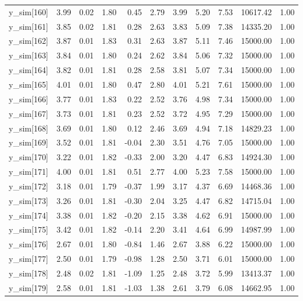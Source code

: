 \begin{table}[ht]
\begin{tabular}{rrrrrrrrrrr}
  y\_sim[160] & 3.99 & 0.02 & 1.80 & 0.45 & 2.79 & 3.99 & 5.20 & 7.53 & 10617.42 & 1.00 \\ 
  y\_sim[161] & 3.85 & 0.02 & 1.81 & 0.28 & 2.63 & 3.83 & 5.09 & 7.38 & 14335.20 & 1.00 \\ 
  y\_sim[162] & 3.87 & 0.01 & 1.83 & 0.31 & 2.63 & 3.87 & 5.11 & 7.46 & 15000.00 & 1.00 \\ 
  y\_sim[163] & 3.84 & 0.01 & 1.80 & 0.24 & 2.62 & 3.84 & 5.06 & 7.32 & 15000.00 & 1.00 \\ 
  y\_sim[164] & 3.82 & 0.01 & 1.81 & 0.28 & 2.58 & 3.81 & 5.07 & 7.34 & 15000.00 & 1.00 \\ 
  y\_sim[165] & 4.01 & 0.01 & 1.80 & 0.47 & 2.80 & 4.01 & 5.21 & 7.61 & 15000.00 & 1.00 \\ 
  y\_sim[166] & 3.77 & 0.01 & 1.83 & 0.22 & 2.52 & 3.76 & 4.98 & 7.34 & 15000.00 & 1.00 \\ 
  y\_sim[167] & 3.73 & 0.01 & 1.81 & 0.23 & 2.52 & 3.72 & 4.95 & 7.29 & 15000.00 & 1.00 \\ 
  y\_sim[168] & 3.69 & 0.01 & 1.80 & 0.12 & 2.46 & 3.69 & 4.94 & 7.18 & 14829.23 & 1.00 \\ 
  y\_sim[169] & 3.52 & 0.01 & 1.81 & -0.04 & 2.30 & 3.51 & 4.76 & 7.05 & 15000.00 & 1.00 \\ 
  y\_sim[170] & 3.22 & 0.01 & 1.82 & -0.33 & 2.00 & 3.20 & 4.47 & 6.83 & 14924.30 & 1.00 \\ 
  y\_sim[171] & 4.00 & 0.01 & 1.81 & 0.51 & 2.77 & 4.00 & 5.23 & 7.58 & 15000.00 & 1.00 \\ 
  y\_sim[172] & 3.18 & 0.01 & 1.79 & -0.37 & 1.99 & 3.17 & 4.37 & 6.69 & 14468.36 & 1.00 \\ 
  y\_sim[173] & 3.26 & 0.01 & 1.81 & -0.30 & 2.04 & 3.25 & 4.47 & 6.82 & 14715.04 & 1.00 \\ 
  y\_sim[174] & 3.38 & 0.01 & 1.82 & -0.20 & 2.15 & 3.38 & 4.62 & 6.91 & 15000.00 & 1.00 \\ 
  y\_sim[175] & 3.42 & 0.01 & 1.82 & -0.14 & 2.20 & 3.41 & 4.64 & 6.99 & 14987.99 & 1.00 \\ 
  y\_sim[176] & 2.67 & 0.01 & 1.80 & -0.84 & 1.46 & 2.67 & 3.88 & 6.22 & 15000.00 & 1.00 \\ 
  y\_sim[177] & 2.50 & 0.01 & 1.79 & -0.98 & 1.28 & 2.50 & 3.71 & 6.01 & 15000.00 & 1.00 \\ 
  y\_sim[178] & 2.48 & 0.02 & 1.81 & -1.09 & 1.25 & 2.48 & 3.72 & 5.99 & 13413.37 & 1.00 \\ 
  y\_sim[179] & 2.58 & 0.01 & 1.81 & -1.03 & 1.38 & 2.61 & 3.79 & 6.08 & 14662.95 & 1.00 \\ 

\end{tabular}
\end{table}
